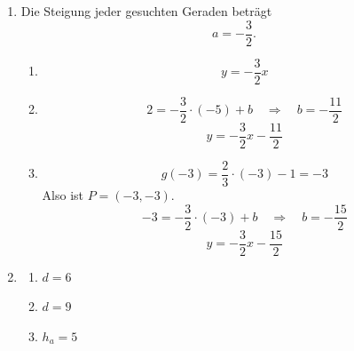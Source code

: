 \begin{enumerate}
    \item
          Die Steigung jeder gesuchten Geraden beträgt
          \[
              a=-\frac32.
          \]

          \begin{enumerate}
              \item
                    \[
                        \boxed{y=-\frac32x}
                    \]

              \item
                    \[
                        2=-\frac32\cdot(-5)+b
                        \quad\Longrightarrow\quad b=-\frac{11}{2}
                    \]
                    \[
                        \boxed{y=-\frac32x-\frac{11}{2}}
                    \]

              \item
                    \[
                        g(-3)=\frac23\cdot(-3)-1=-3
                    \]
                    Also ist \(P=(-3, -3)\).
                    \[
                        -3=-\frac32\cdot(-3)+b
                        \quad\Longrightarrow\quad b=-\frac{15}{2}
                    \]
                    \[
                        \boxed{y=-\frac32x-\frac{15}{2}}
                    \]
          \end{enumerate}

    \item
          \begin{enumerate}
              \item
                    \(
                    d=6
                    \)

              \item
                    \(
                    d=9
                    \)

              \item
                    \(
                    h_a =5
                    \)
          \end{enumerate}

\end{enumerate}